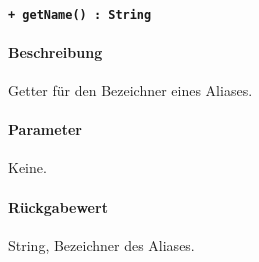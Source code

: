 \paragraph{\texttt{+ getName() : String}}\label{AP_Alias_getName}%
\paragraph*{Beschreibung}
Getter für den Bezeichner eines Aliases.
\paragraph*{Parameter}
Keine.
\paragraph*{Rückgabewert}
String, Bezeichner des Aliases.